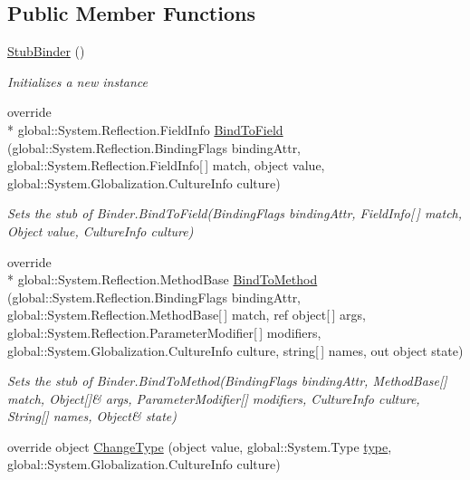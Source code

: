 \subsection*{Public Member Functions}
\begin{DoxyCompactItemize}
\item 
\hyperlink{class_system_1_1_reflection_1_1_fakes_1_1_stub_binder_a86318d33779163a27238fab06116f995}{Stub\-Binder} ()
\begin{DoxyCompactList}\small\item\em Initializes a new instance\end{DoxyCompactList}\item 
override \\*
global\-::\-System.\-Reflection.\-Field\-Info \hyperlink{class_system_1_1_reflection_1_1_fakes_1_1_stub_binder_ab3cd1ec5f81e5c5bd6c7b81ee5593b0a}{Bind\-To\-Field} (global\-::\-System.\-Reflection.\-Binding\-Flags binding\-Attr, global\-::\-System.\-Reflection.\-Field\-Info\mbox{[}$\,$\mbox{]} match, object value, global\-::\-System.\-Globalization.\-Culture\-Info culture)
\begin{DoxyCompactList}\small\item\em Sets the stub of Binder.\-Bind\-To\-Field(\-Binding\-Flags binding\-Attr, Field\-Info\mbox{[}$\,$\mbox{]} match, Object value, Culture\-Info culture)\end{DoxyCompactList}\item 
override \\*
global\-::\-System.\-Reflection.\-Method\-Base \hyperlink{class_system_1_1_reflection_1_1_fakes_1_1_stub_binder_a9106bfc16e483db139aef62f43478edf}{Bind\-To\-Method} (global\-::\-System.\-Reflection.\-Binding\-Flags binding\-Attr, global\-::\-System.\-Reflection.\-Method\-Base\mbox{[}$\,$\mbox{]} match, ref object\mbox{[}$\,$\mbox{]} args, global\-::\-System.\-Reflection.\-Parameter\-Modifier\mbox{[}$\,$\mbox{]} modifiers, global\-::\-System.\-Globalization.\-Culture\-Info culture, string\mbox{[}$\,$\mbox{]} names, out object state)
\begin{DoxyCompactList}\small\item\em Sets the stub of Binder.\-Bind\-To\-Method(Binding\-Flags binding\-Attr, Method\-Base\mbox{[}\mbox{]} match, Object\mbox{[}\mbox{]}\& args, Parameter\-Modifier\mbox{[}\mbox{]} modifiers, Culture\-Info culture, String\mbox{[}\mbox{]} names, Object\& state)\end{DoxyCompactList}\item 
override object \hyperlink{class_system_1_1_reflection_1_1_fakes_1_1_stub_binder_af582270be01a6ca984cdec772f8448c6}{Change\-Type} (object value, global\-::\-System.\-Type \hyperlink{jquery-1_810_82-vsdoc_8js_a3940565e83a9bfd10d95ffd27536da91}{type}, global\-::\-System.\-Globalization.\-Culture\-Info culture)

\end{DoxyCompactItemize}
